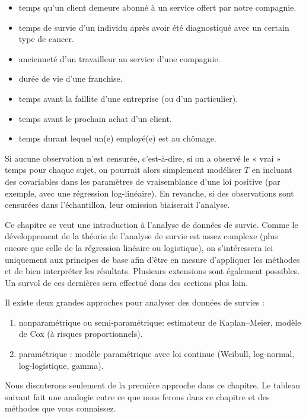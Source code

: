 \documentclass[
  11pt,
  letterpaper,
]{scrbook}
\providecommand{\tightlist}{%
  \setlength{\itemsep}{0pt}\setlength{\parskip}{0pt}}\usepackage{longtable,booktabs,array}
\theoremstyle{definition}
\theoremstyle{remark}
\begin{document}
\begin{itemize}
\tightlist
\item
  temps qu'un client demeure abonné à un service offert par notre
  compagnie.
\item
  temps de survie d'un individu après avoir été diagnostiqué avec un
  certain type de cancer.
\item
  ancienneté d'un travailleur au service d'une compagnie.
\item
  durée de vie d'une franchise.
\item
  temps avant la faillite d'une entreprise (ou d'un particulier).
\item
  temps avant le prochain achat d'un client.
\item
  temps durant lequel un(e) employé(e) est au chômage.
\end{itemize}

Si aucune observation n'est censurée, c'est-à-dire, si on a observé le «
vrai » temps pour chaque sujet, on pourrait alors simplement modéliser
\(T\) en incluant des covariables dans les paramètres de vraisemblance
d'une loi positive (par exemple, avec une régression log-linéaire). En
revanche, si des observations sont censurées dans l'échantillon, leur
omission biaiserait l'analyse.

Ce chapitre se veut une introduction à l'analyse de données de survie.
Comme le développement de la théorie de l'analyse de survie est assez
complexe (plus encore que celle de la régression linéaire ou
logistique), on s'intéressera ici uniquement aux principes de base afin
d'être en mesure d'appliquer les méthodes et de bien interpréter les
résultats. Plusieurs extensions sont également possibles. Un survol de
ces dernières sera effectué dans des sections plus loin.

Il existe deux grandes approches pour analyser des données de survies :

\begin{enumerate}
\def\labelenumi{\roman{enumi})}
\tightlist
\item
  nonparamétrique ou semi-paramétrique: estimateur de Kaplan--Meier,
  modèle de Cox (à risques proportionnels).
\item
  paramétrique : modèle paramétrique avec loi continue (Weibull,
  log-normal, log-logistique, gamma).
\end{enumerate}

Nous discuterons seulement de la première approche dans ce chapitre. Le
tableau suivant fait une analogie entre ce que nous ferons dans ce
chapitre et des méthodes que vous connaissez.
\end{document}
